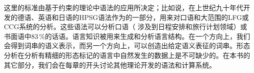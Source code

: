 这里的标准由基于约束的理论中语法的应用所决定；比如说，在上世纪九十年代开发的德语、英语和日语的HPSG语法作为\verbmobil \citep{Wahlster2000a-ed-not-crossreferenced}的一部分，用来对口语和大范围的LFG\indexlfg 或CCG系统\indexccg 的分析。这些语法可以分析口语（\verbmobil
涉及到日程安排和旅行计划领域）或书面语中83\,\%的话语。语言知识被用来生成和分析语言结构。在一个方向上，我们会得到词串的语义表示，而另一个方向上，可以创造出给定语义表征的词串。形态分析在分析有精细的形态标记的语言中自然发生的数据上是不可缺少的。在本书的其它部分，我们会在每章的开头讨论其他理论开发的语法和计算系统。

